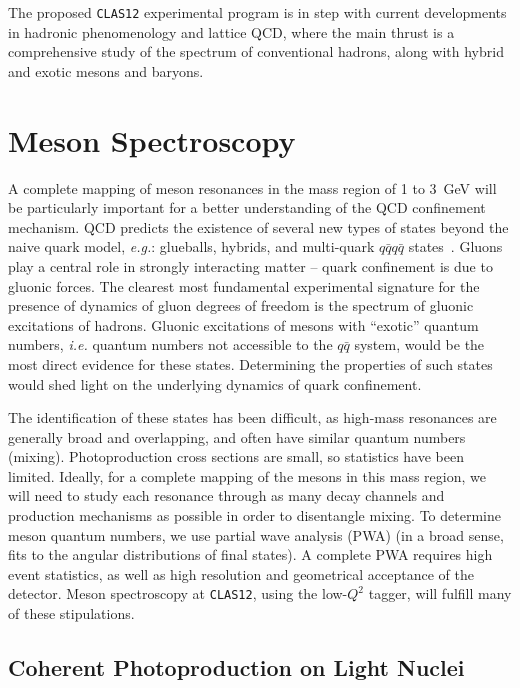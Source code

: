 The proposed {\tt CLAS12} experimental program is in step with current 
developments in hadronic phenomenology and lattice QCD, where the main 
thrust is a comprehensive study of the spectrum of conventional hadrons,
along with hybrid and exotic mesons and baryons. 

\section{Meson Spectroscopy}

A complete mapping of meson resonances in the mass region of 1 to 3~GeV
will be particularly important for a better understanding of the QCD 
confinement mechanism. QCD predicts the existence of several new types 
of states beyond the naive quark model, {\it e.g.}: glueballs, hybrids, 
and multi-quark $q\bar{q} q\bar{q}$ states~\cite{Is85,Ko85}.  Gluons play 
a central role in strongly interacting matter -- quark confinement is due 
to gluonic forces. The clearest most fundamental experimental signature for 
the presence of dynamics of gluon degrees of freedom is the spectrum of 
gluonic excitations of hadrons. Gluonic excitations of mesons with 
``exotic'' quantum numbers, {\it i.e.} quantum numbers not accessible 
to the $q\bar{q}$ system, would be the most direct evidence for these
states. Determining the properties of such states would shed light on
the underlying dynamics of quark confinement.

The identification of these states has been difficult, as high-mass
resonances are generally broad and overlapping, and often have similar
quantum numbers (mixing). Photoproduction cross sections are small, so
statistics have been limited. Ideally, for a complete mapping of the
mesons in this mass region, we will need to study each resonance
through as many decay channels and production mechanisms as possible
in order to disentangle mixing. To determine meson quantum numbers, we
use partial wave analysis (PWA) (in a broad sense, fits to the angular
distributions of final states). A complete PWA requires high event
statistics, as well as high resolution and geometrical acceptance of
the detector. Meson spectroscopy at {\tt CLAS12}, using the low-$Q^2$ 
tagger, will fulfill many of these stipulations.

\subsection{Coherent Photoproduction on Light Nuclei}
\label{he4}

